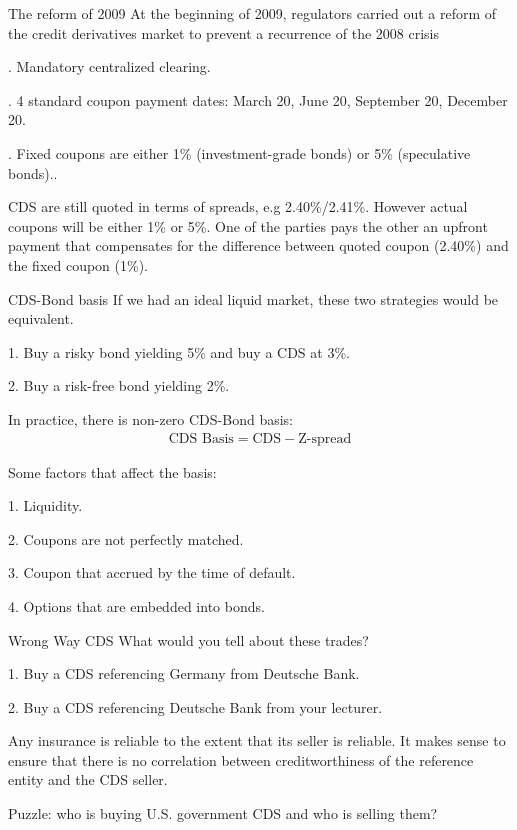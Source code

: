 \documentclass{beamer}
\begin{document}
\begin{frame}{The reform of 2009}
\justify
At the beginning of 2009, regulators carried out a reform of the credit derivatives market to prevent a recurrence of the 2008 crisis

. Mandatory centralized clearing.

. 4 standard coupon payment dates: March 20, June 20, September 20, December 20.

. Fixed coupons are either 1\% (investment-grade bonds) or 5\% (speculative bonds)..

\justify
CDS are still quoted in terms of spreads, e.g 2.40\%/2.41\%. However actual coupons will be either 1\% or 5\%. One of the parties pays the other an upfront payment that compensates for the difference between quoted coupon (2.40\%) and the fixed coupon (1\%).

\end{frame}



\begin{frame}{CDS-Bond basis}
\justify
If we had an ideal liquid market, these two strategies would be equivalent.

1. Buy a risky bond yielding 5\% and buy a CDS at 3\%.

2. Buy a risk-free bond yielding 2\%.

\justify
In practice, there is non-zero CDS-Bond basis:
\begin{align*}
\text{CDS Basis} = \text{CDS} - \text{Z-spread}
\end{align*}

\justify
Some factors that affect the basis:

1. Liquidity.

2. Coupons are not perfectly matched.

3. Coupon that accrued by the time of default.

4. Options that are embedded into bonds.
\end{frame}



\begin{frame}{Wrong Way CDS}
\justify
What would you tell about these trades?

1. Buy a CDS referencing Germany from Deutsche Bank.

2. Buy a CDS referencing Deutsche Bank from your lecturer.

\justify
Any insurance is reliable to the extent that its seller is reliable. It makes sense to ensure that there is no correlation between creditworthiness of the reference entity and the CDS seller.

\justify
Puzzle: who is buying U.S. government CDS and who is selling them?
\end{frame}
\end{document}
